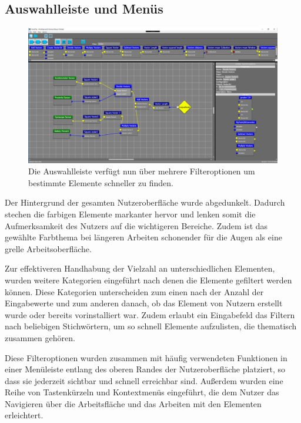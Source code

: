 \subsection{Auswahlleiste und Men\"us}

\begin{figure}[h!]
	\centering
		\includegraphics[width = \textwidth]{Screenshots/Smastra_1_4_filter_top_menu}
	\caption{Die Auswahlleiste verf\"ugt nun \"uber mehrere Filteroptionen um bestimmte Elemente schneller zu finden.}
	\label{fig:screenshot_1_4_filter_top_menu}
\end{figure}

Der Hintergrund der gesamten Nutzeroberfl\"ache wurde abgedunkelt. Dadurch stechen die farbigen Elemente markanter hervor und lenken somit die Aufmerksamkeit des Nutzers auf die wichtigeren Bereiche. Zudem ist das gew\"ahlte Farbthema bei l\"angeren Arbeiten schonender f\"ur die Augen als eine grelle Arbeitsoberfl\"ache.

Zur effektiveren Handhabung der Vielzahl an unterschiedlichen Elementen, wurden weitere Kategorien eingef\"uhrt nach denen die Elemente gefiltert werden k\"onnen.
Diese Kategorien unterscheiden zum einen nach der Anzahl der Eingabewerte und zum anderen danach, ob das Element von Nutzern erstellt wurde oder bereits vorinstalliert war.
Zudem erlaubt ein Eingabefeld das Filtern nach beliebigen Stichw\"ortern, um so schnell Elemente aufzulisten, die thematisch zusammen geh\"oren.

Diese Filteroptionen wurden zusammen mit h\"aufig verwendeten Funktionen in einer Men\"uleiste entlang des oberen Randes der Nutzeroberfl\"ache platziert, so dass sie jederzeit sichtbar und schnell erreichbar sind. Au{\ss}erdem wurden eine Reihe von Tastenk\"urzeln und Kontextmen\"us eingef\"uhrt, die dem Nutzer das Navigieren \"uber die Arbeitsfl\"ache und das Arbeiten mit den Elementen erleichtert.

